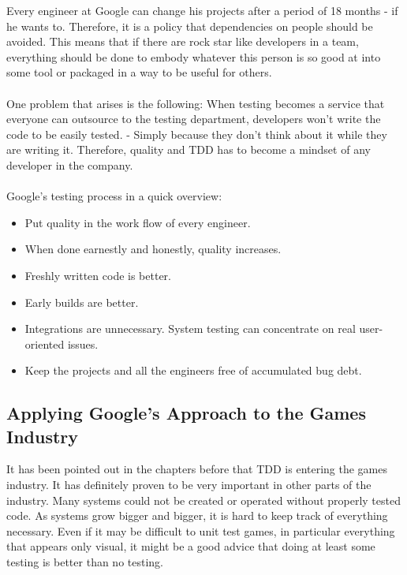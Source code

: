     Every engineer at Google can change his projects after a period of 18 months - if he wants to. 
    Therefore, it is a policy that dependencies on people should be avoided. This means that if there are rock star like developers in a team, 
    everything should be done to embody whatever this person is so good at into some tool or packaged in a way to be useful for others. 
    \\ \\ 
    One problem that arises is the following:
    When testing becomes a service that everyone can outsource to the testing department, 
    developers won't write the code to be easily tested.
    - Simply because they don't think about it while they are writing it. Therefore, quality and TDD has to become a mindset of any developer in the company.
    \\ \\
    Google's testing process in a quick overview: 
    \begin{itemize}
        \item Put quality in the work flow of every engineer.
        \item When done earnestly and honestly, quality increases.
        \item Freshly written code is better.
        \item Early builds are better.
        \item Integrations are unnecessary. System testing can concentrate on real user-oriented
            issues.
        \item Keep the projects and all the engineers free of accumulated bug debt.
    \end{itemize}

    \subsection{Applying Google's Approach to the Games Industry}
        It has been pointed out in the chapters before 
        that TDD is entering the games industry.
        It has definitely proven to be very important in other parts of the industry. 
        Many systems could not be created or operated without properly tested code. 
        As systems grow bigger and bigger, it is hard to keep track of everything necessary. 
        Even if it may be difficult to unit test games, in particular everything that appears only visual, 
        it might be a good advice that doing at least some testing is better than no testing. 
        
